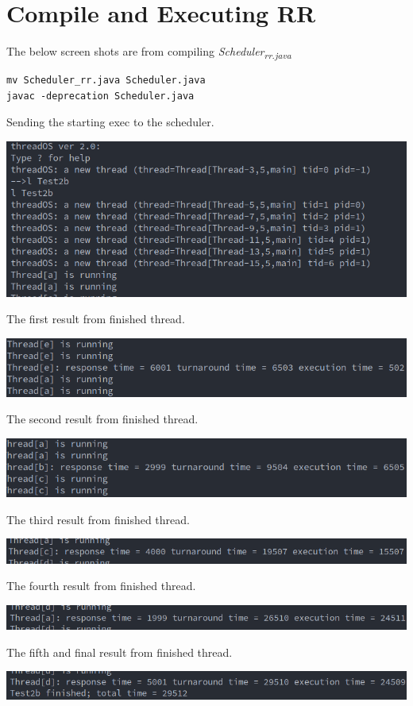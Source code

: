 \documentclass[a4paper,11pt,twoside]{article}
\begin{document}
\section*{Compile and Executing RR}
\label{sec:org01dc5ba}
The below screen shots are from compiling \emph{Scheduler\textsubscript{rr.java}}
\begin{verbatim}
mv Scheduler_rr.java Scheduler.java
javac -deprecation Scheduler.java
\end{verbatim}
Sending the starting exec to the scheduler.
\begin{center}
\includegraphics[width=.9\linewidth]{./rr0.png}
\end{center}
The first result from finished thread.
\begin{center}
\includegraphics[width=.9\linewidth]{./rr1.png}
\end{center}
The second result from finished thread.
\begin{center}
\includegraphics[width=.9\linewidth]{./rr2.png}
\end{center}
The third result from finished thread.
\begin{center}
\includegraphics[width=.9\linewidth]{./rr3.png}
\end{center}
The fourth result from finished thread.
\begin{center}
\includegraphics[width=.9\linewidth]{./rr4.png}
\end{center}
The fifth and final result from finished thread.
\begin{center}
\includegraphics[width=.9\linewidth]{./rr5.png}
\end{center}
\end{document}
